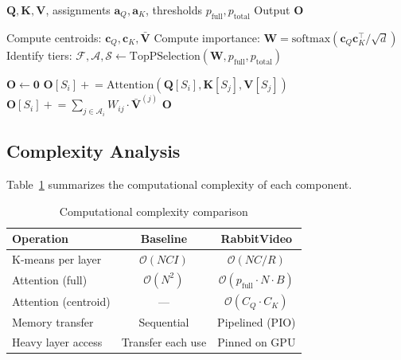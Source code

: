 \begin{algorithm}[t]
\caption{BIT: Block-Importance Tiers}
\label{alg:ctaa}
\begin{algorithmic}[1]
\REQUIRE $\mathbf{Q}, \mathbf{K}, \mathbf{V}$, assignments $\mathbf{a}_Q, \mathbf{a}_K$, thresholds $p_{\text{full}}, p_{\text{total}}$
\ENSURE Output $\mathbf{O}$

\STATE Compute centroids: $\mathbf{c}_Q, \mathbf{c}_K, \bar{\mathbf{V}}$
\STATE Compute importance: $\mathbf{W} = \text{softmax}(\mathbf{c}_Q \mathbf{c}_K^\top / \sqrt{d})$
\STATE Identify tiers: $\mathcal{F}, \mathcal{A}, \mathcal{S} \gets \text{TopPSelection}(\mathbf{W}, p_{\text{full}}, p_{\text{total}})$

\STATE $\mathbf{O} \gets \mathbf{0}$
    \STATE {}
        \STATE $\mathbf{O}[S_i] \mathrel{+}= \text{Attention}(\mathbf{Q}[S_i], \mathbf{K}[S_j], \mathbf{V}[S_j])$
    \ENDFOR
    \STATE {}
    \STATE $\mathbf{O}[S_i] \mathrel{+}= \sum_{j \in \mathcal{A}_i} W_{ij} \cdot \bar{\mathbf{V}}^{(j)}$
\ENDFOR
\RETURN $\mathbf{O}$
\end{algorithmic}
\end{algorithm}

\subsection{Complexity Analysis}
\label{sec:complexity}

Table~\ref{tab:complexity} summarizes the computational complexity of each component.

\begin{table}[h]
\centering
\caption{Computational complexity comparison}
\label{tab:complexity}
\begin{tabular}{lcc}
\toprule
\textbf{Operation} & \textbf{Baseline} & \textbf{RabbitVideo} \\
\midrule
K-means per layer & $\mathcal{O}(NCI)$ & $\mathcal{O}(NC/R)$ \\
Attention (full) & $\mathcal{O}(N^2)$ & $\mathcal{O}(p_{\text{full}} \cdot N \cdot B)$ \\
Attention (centroid) & --- & $\mathcal{O}(C_Q \cdot C_K)$ \\
Memory transfer & Sequential & Pipelined (PIO) \\
Heavy layer access & Transfer each use & Pinned on GPU \\
\bottomrule
\end{tabular}
\end{table}

